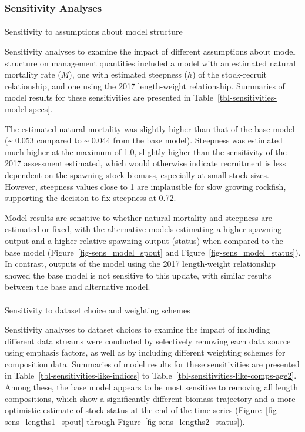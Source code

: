 \documentclass[
  english,
]{article}
\makeatletter
\let\oldparagraph\paragraph
\renewcommand{\paragraph}{
    \@ifstar
      \xxxParagraphStar
      \xxxParagraphNoStar
  }
\newcommand{\xxxParagraphStar}[1]{\oldparagraph*{#1}\mbox{}}
\newcommand{\xxxParagraphNoStar}[1]{\oldparagraph{#1}\mbox{}}
\makeatother
\begin{document}
\subsubsection{Sensitivity Analyses}\label{sensitivity-analyses}

\paragraph{Sensitivity to assumptions about model
structure}\label{sensitivity-to-assumptions-about-model-structure}

Sensitivity analyses to examine the impact of different assumptions
about model structure on management quantities included a model with an
estimated natural mortality rate (\(M\)), one with estimated steepness
(\(h\)) of the stock-recruit relationship, and one using the 2017
length-weight relationship. Summaries of model results for these
sensitivities are presented in
Table~\ref{tbl-sensitivities-model-specs}.

The estimated natural mortality was slightly higher than that of the
base model (\textasciitilde{} 0.053 compared to \textasciitilde{} 0.044
from the base model). Steepness was estimated much higher at the maximum
of 1.0, slightly higher than the sensitivity of the 2017 assessment
estimated, which would otherwise indicate recruitment is less dependent
on the spawning stock biomass, especially at small stock sizes. However,
steepness values close to 1 are implausible for slow growing rockfish,
supporting the decision to fix steepness at 0.72.

Model results are sensitive to whether natural mortality and steepness
are estimated or fixed, with the alternative models estimating a higher
spawning output and a higher relative spawning output (status) when
compared to the base model (Figure~\ref{fig-sens_model_spout} and
Figure~\ref{fig-sens_model_status}). In contrast, outputs of the model
using the 2017 length-weight relationship showed the base model is not
sensitive to this update, with similar results between the base and
alternative model.

\paragraph{Sensitivity to dataset choice and weighting
schemes}\label{sensitivity-to-dataset-choice-and-weighting-schemes}

Sensitivity analyses to dataset choices to examine the impact of
including different data streams were conducted by selectively removing
each data source using emphasis factors, as well as by including
different weighting schemes for composition data. Summaries of model
results for these sensitivities are presented in
Table~\ref{tbl-sensitivities-like-indices} to
Table~\ref{tbl-sensitivities-like-comps-age2}. Among these, the base
model appears to be most sensitive to removing all length compositions,
which show a significantly different biomass trajectory and a more
optimistic estimate of stock status at the end of the time series
(Figure~\ref{fig-sens_lengths1_spout} through
Figure~\ref{fig-sens_lengths2_status}).
\end{document}
